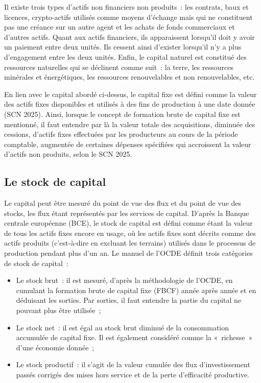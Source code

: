 \documentclass[12pt,a4paper,oneside]{report}
\begin{document}
Il existe trois types d’actifs non financiers non produits~: les contrats, baux et licences, crypto-actifs
utilisés comme moyens d’échange mais qui ne constituent pas une créance sur un autre agent et les achats de
fonds commerciaux et d’autres actifs. Quant aux actifs financiers, ils apparaissent lorsqu’il doit y avoir un
paiement entre deux unités. Ils cessent ainsi d’exister lorsqu’il n’y a plus d’engagement entre les deux
unités. Enfin, le capital naturel est constitué des ressources naturelles qui se déclinent comme suit~: la
terre, les ressources minérales et énergétiques, les ressources renouvelables et non renouvelables, etc.

En lien avec le capital abordé ci-dessus, le capital fixe est défini comme la valeur des actifs fixes
disponibles et utilisés à des fins de production à une date donnée (SCN 2025). Ainsi, lorsque le concept de
formation brute de capital fixe est mentionné, il faut entendre par là la valeur totale des acquisitions,
diminuée des cessions, d’actifs fixes effectuées par les producteurs au cours de la période comptable,
augmentée de certaines dépenses spécifiées qui accroissent la valeur d’actifs non produits, selon le SCN 2025.

\subsection{Le stock de capital}

Le capital peut être mesuré du point de vue des flux et du point de vue des stocks, les flux étant représentés
par les services de capital. D’après la Banque centrale européenne (BCE), le stock de capital est défini comme
étant la valeur de tous les actifs fixes encore en usage, où les actifs fixes sont décrits comme des actifs
produits (c’est-à-dire en excluant les terrains) utilisés dans le processus de production pendant plus d’un
an. Le manuel de l’OCDE définit trois catégories de stock de capital~:

\begin{itemize}

\item Le stock brut~: il est mesuré, d’après la méthodologie de l’OCDE, en cumulant la formation brute de
capital fixe (FBCF) année après année et en déduisant les sorties. Par sorties, il faut entendre la partie du
capital ne pouvant plus être utilisée~;

\item Le stock net~: il est égal au stock brut diminué de la consommation accumulée de capital fixe. Il est
également considéré comme la «~richesse~» d’une économie donnée~;

\item Le stock productif~: il s’agit de la valeur cumulée des flux d’investissement passés corrigés des mises
hors service et de la perte d’efficacité productive.

\end{itemize}
\end{document}
